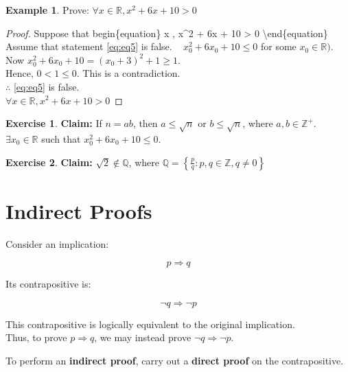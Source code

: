 \documentclass[
]{book}
\theoremstyle{definition}
\theoremstyle{definition}
\newtheorem{example}{Example}[chapter]
\theoremstyle{definition}
\newtheorem{exercise}{Exercise}[chapter]
\theoremstyle{definition}
\theoremstyle{remark}
\begin{document}
\begin{example}
\protect\hypertarget{exm:unnamed-chunk-80}{}\label{exm:unnamed-chunk-80}Prove: \(\forall  x \in \mathbb{R}, x^2 + 6x + 10 > 0\)
\end{example}

\begin{proof}
Suppose that
begin\{equation\}
\forall  x \in {}, x\^{}2 + 6x + 10 \textgreater{} 0 \label{eq:eq5}
\textbackslash end\{equation\}
Assume that statement \eqref{eq:eq5} is false. ~
\(x_0^2 + 6x_0 + 10 \leq 0\) for some \(x_0 \in \mathbb{R})\).\\
Now \(x_0^2 + 6x_0 + 10 =(x_0+3)^2+1\geq 1\).\\
Hence, \(0<1\leq 0\). This is a contradiction.\\
\(\therefore\) \eqref{eq:eq5} is false.\\
\(\forall  x \in \mathbb{R}, x^2 + 6x + 10 > 0\)
\end{proof}

\begin{exercise}
\protect\hypertarget{exr:unnamed-chunk-82}{}\label{exr:unnamed-chunk-82}\textbf{Claim:} If \(n = ab\), then \(a \leq \sqrt{n}\) or \(b \leq \sqrt{n}\), where \(a, b \in \mathbb{Z}^+\).\\
\(\exists x_0 \in \mathbb{R}\) such that \(x_0^2 + 6x_0 + 10 \leq 0\).
\end{exercise}

\begin{exercise}
\protect\hypertarget{exr:unnamed-chunk-83}{}\label{exr:unnamed-chunk-83}\textbf{Claim:} \(\sqrt{2} \notin \mathbb{Q}\), where \(\mathbb{Q}=\left\{\frac{p}{q}:p,q \in \mathbb{Z}, q\neq 0\right\}\)
\end{exercise}

\section{Indirect Proofs}\label{indirect-proofs}

Consider an implication:

\[
p \Rightarrow q
\]

Its contrapositive is:

\[
\neg q \Rightarrow \neg p
\]

This contrapositive is logically equivalent to the original implication.\\
Thus, to prove \(p \Rightarrow q\), we may instead prove \(\neg q \Rightarrow \neg p\).

To perform an \textbf{indirect proof}, carry out a \textbf{direct proof} on the contrapositive.
\end{document}
